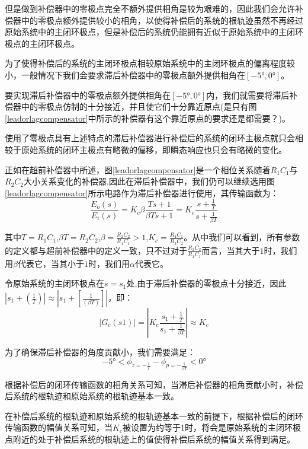 \documentclass{article}
\numberwithin{equation}{section}
\numberwithin{figure}{section}
\begin{document}
但是做到补偿器中的零极点完全不额外提供相角是较为艰难的，因此我们会允许补偿器中的零极点额外提供较小的相角，以使得补偿后的系统的根轨迹虽然不再经过原始系统中的主闭环极点，但是补偿后的系统仍能拥有近似于原始系统中的主闭环极点的主闭环极点。

为了使得补偿后的系统的主闭环极点相较原始系统中的主闭环极点的偏离程度较小，一般情况下我们会要求滞后补偿器中的零极点额外提供相角在$[-5°,0°]$。

要实现滞后补偿器中的零极点额外提供相角在$[-5°,0°]$内，我们就需要将滞后补偿器中的零极点仿制的十分接近，并且使它们十分靠近原点(是只有图\ref{leadorlagcompensator}中所示的补偿器有这个靠近原点的要求还是都需要？)。

使用了零极点具有上述特点的滞后补偿器进行补偿后的系统的闭环主极点就只会相较于原始系统的闭环主极点有略微的偏移，即瞬态响应也只会有略微的变化。

正如在超前补偿器中所述，图\ref{leadorlagcompensator}是一个相位关系随着$R_1C_1$与$R_2C_2$大小关系变化的补偿器,因此在滞后补偿器中，我们仍可以继续选用图\ref{leadorlagcompensator}所示电路作为滞后补偿器进行使用，其传输函数为：
\begin{equation}
    \frac{E_o(s)}{E_i(s)}=K_c\beta\frac{Ts+1}{\beta Ts+1}=K_c\frac{s+\frac{1}{T}}{s+\frac{1}{\beta T}}
\end{equation}

其中$T=R_1C_1$,$\beta T=R_2C_2$,$\beta=\frac{R_2C_2}{R_1C_1}>1$,$K_c=\frac{R_4C_1}{R_3C_2}$。从中我们可以看到，所有参数的定义都与超前补偿器中的定义一致，只不过对于$\frac{R_2C_2}{R_1C_1}$而言，当其大于$1$时，我们用$\beta$代表它，当其小于$1$时，我们用$\alpha$代表它。

令原始系统的主闭环极点在$s=s_1$处,由于滞后补偿器的零极点十分接近，因此$|s_1+(\frac{1}{T})|≈|s_1+[\frac{1}{(\beta T)}]|$，即：
\begin{equation}
    |G_c(s1)|=|K_c\frac{s_1+\frac{1}{T}}{s_1+\frac{1}{\beta T}}|≈K_c
\end{equation}

为了确保滞后补偿器的角度贡献小，我们需要满足：
\begin{equation}
    -5°<\phi_{z=-\frac{1}{T}}-\phi_{p=-\frac{1}{\beta T}}<0°
\end{equation}

根据补偿后的闭环传输函数的相角关系可知，当滞后补偿器的相角贡献小时，补偿后系统的根轨迹和原始系统的根轨迹基本一致。

在补偿后系统的根轨迹和原始系统的根轨迹基本一致的前提下，根据补偿后的闭环传输函数的幅值关系可知，当$K_c$被设置为约等于1时，将会是原始系统的主闭环极点附近的处于补偿后系统的根轨迹上的值使得补偿后系统的幅值关系得到满足。
\end{document}
